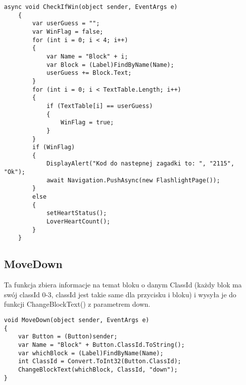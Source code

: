 \begin{lstlisting}[caption=CheckIfWin]
	 async void CheckIfWin(object sender, EventArgs e)
	{
		var userGuess = "";
		var WinFlag = false;
		for (int i = 0; i < 4; i++)
		{
			var Name = "Block" + i;
			var Block = (Label)FindByName(Name);
			userGuess += Block.Text;
		}
		for (int i = 0; i < TextTable.Length; i++)
		{
			if (TextTable[i] == userGuess)
			{
				WinFlag = true;
			}
		}
		if (WinFlag)
		{
			DisplayAlert("Kod do nastepnej zagadki to: ", "2115", "Ok");
			await Navigation.PushAsync(new FlashlightPage());
		}
		else
		{
			setHeartStatus();
			LoverHeartCount();
		}
	}
\end{lstlisting}

\subsection{MoveDown}
Ta funkcja zbiera informacje na temat bloku o danym ClassId (każdy blok ma swój classId 0-3, classId jest takie same dla przycisku i bloku) i wysyła je do funkcji ChangeBlockText() z parametrem down.
\begin{lstlisting}[caption=MoveDown]
        void MoveDown(object sender, EventArgs e)
{
	var Button = (Button)sender;
	var Name = "Block" + Button.ClassId.ToString();
	var whichBlock = (Label)FindByName(Name);
	int ClassId = Convert.ToInt32(Button.ClassId);
	ChangeBlockText(whichBlock, ClassId, "down");
}
\end{lstlisting}